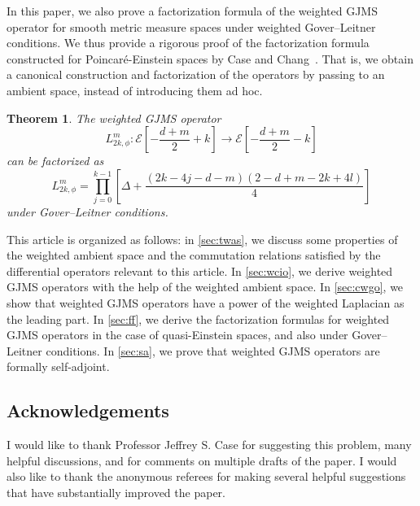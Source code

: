 \documentclass{amsart}
\newtheorem{theorem}{Theorem}[section]
\begin{document}
In this paper, we also prove a factorization formula of the weighted GJMS operator for smooth metric measure spaces under weighted Gover--Leitner conditions. We thus provide a rigorous proof of the factorization formula constructed for Poincar\'e-Einstein spaces by Case and Chang~\cites{CaseChang2013}. {That is, we obtain a canonical construction and factorization of the operators by passing to an ambient space, instead of introducing them ad hoc.}
\begin{theorem}
\label{gover-leitner-theorem}
The weighted GJMS operator
\begin{equation*}L_{2k,\phi}^m: \mathcal{E}\left[-\frac{d+m}{2}+k\right] \rightarrow \mathcal{E}\left[-\frac{d+m}{2}-k\right]\end{equation*}
can be factorized as
\begin{equation*}
L_{2k,\phi}^m =\prod_{j=0}^{k-1}\left[\Delta+\frac{(2 k-4 j-d-m)(2-d+m-2 k+4 l)}{4}\right]
\end{equation*}
under Gover--Leitner conditions.
\end{theorem}



This article is organized as follows: in \cref{sec:twas}, we discuss some properties of the weighted ambient space and the commutation relations satisfied by the differential operators relevant to this article. In \cref{sec:wcio}, we derive weighted GJMS operators with the help of the weighted ambient space. In \cref{sec:cwgo}, we show that weighted GJMS operators have a power of the weighted Laplacian as the leading part. In \cref{sec:ff}, we derive the factorization formulas for weighted GJMS operators in the case of quasi-Einstein spaces, and also under Gover--Leitner conditions. In \cref{sec:sa}, we prove that weighted GJMS operators are formally self-adjoint. 

\subsection*{Acknowledgements}
I would like to thank Professor Jeffrey S. Case for suggesting this problem, many helpful discussions, and for comments on multiple drafts of the paper. I would also like to thank the anonymous referees for making several helpful suggestions that have substantially improved the paper. 
\end{document}
